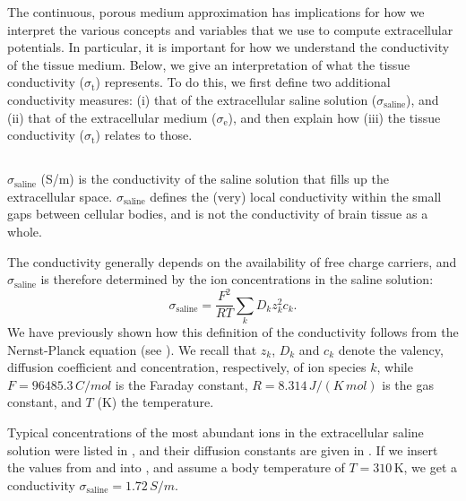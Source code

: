 The continuous, porous medium approximation has implications 
for how we interpret the various concepts and variables that we use to compute extracellular potentials. 
In particular, it is important for how we understand the conductivity of the tissue medium. 
Below, we give an interpretation of what the tissue conductivity ($\sigma_\text{t}$) represents. 
To do this, we first define two additional conductivity measures: 
(i) that of the extracellular saline solution ($\sigma_\text{saline}$), and 
(ii) that of the extracellular medium ($\sigma_\text{e}$), and then explain how 
(iii) the tissue conductivity ($\sigma_\text{t}$) relates to those. 


\subsection{}
\label{sec:Sigma:Ssaline}
$\sigma_\text{saline}$ (\si{S/m}) is the conductivity of the saline solution that fills up the extracellular space. 
$\sigma_\text{saline}$ defines the (very) local conductivity within the small gaps between cellular bodies,
and is not the conductivity of brain tissue as a whole. 

The conductivity generally depends on the availability of free charge carriers, 
and $\sigma_\text{saline}$ is therefore determined by the ion concentrations in the saline solution:
\begin{equation}
\sigma_\text{saline} = \frac{F^2}{RT}\sum_{k} D_k z_{k}^2 c_{k}.
\label{eq:Sigma:sigma1}
\end{equation}
We have previously shown how this definition of the conductivity follows from the Nernst-Planck equation (see ). We recall that $z_{k}$, $D_k$ and $c_{k}$ denote the valency, diffusion coefficient and concentration, respectively, of ion species $k$, while $F = 96485.3 \, \si{C/mol}$ is the Faraday constant, 
$R = 8.314 \,\si{J/(K \, mol)}$ is the gas constant, and $T$ (\si{\kelvin}) the temperature.

Typical concentrations of the most abundant ions in the extracellular saline solution were listed in 
, and their diffusion constants are given in . 
If we insert the values from  and  into , 
and assume a body temperature of $T = 310\, \si{\kelvin}$, 
we get a conductivity $\sigma_\text{saline} = 1.72 \, \si{S/m}$. 

